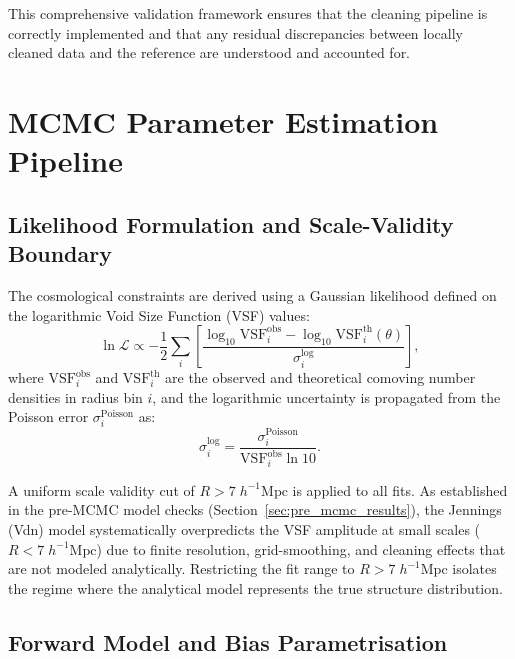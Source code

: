 \documentclass[12pt]{report}
\begin{document}
This comprehensive validation framework ensures that the cleaning pipeline is correctly implemented and that any residual discrepancies between locally cleaned data and the reference are understood and accounted for.


\section{MCMC Parameter Estimation Pipeline}
\label{sec:mcmc_pipeline}

\subsection{Likelihood Formulation and Scale-Validity Boundary}

The cosmological constraints are derived using a Gaussian likelihood defined on the logarithmic Void Size Function (VSF) values:
\begin{equation}
    \ln \mathcal{L} \propto -\frac{1}{2} \sum_{i} \left[ \frac{\log_{10}\mathrm{VSF}_i^{\mathrm{obs}} - \log_{10}\mathrm{VSF}_i^{\mathrm{th}}(\theta)}{\sigma^{\log}_i} \right]
    \label{eq:mcmc_likelihood},
\end{equation}
where $\mathrm{VSF}_i^{\mathrm{obs}}$ and $\mathrm{VSF}_i^{\mathrm{th}}$ are the observed and theoretical comoving number densities in radius bin $i$, and the logarithmic uncertainty is propagated from the Poisson error $\sigma^{\mathrm{Poisson}}_i$ as:
\begin{equation}
    \sigma^{\log}_i = \frac{\sigma^{\mathrm{Poisson}}_i}{\mathrm{VSF}_i^{\mathrm{obs}} \ln 10}.
\end{equation}

A uniform scale validity cut of $R > 7\;h^{-1}\mathrm{Mpc}$ is applied to all fits. As established in the pre-MCMC model checks (Section~\ref{sec:pre_mcmc_results}), the Jennings (Vdn) model systematically overpredicts the VSF amplitude at small scales ($R < 7\;h^{-1}\mathrm{Mpc}$) due to finite resolution, grid-smoothing, and cleaning effects that are not modeled analytically. Restricting the fit range to $R > 7\;h^{-1}\mathrm{Mpc}$ isolates the regime where the analytical model represents the true structure distribution.

\subsection{Forward Model and Bias Parametrisation}
\end{document}
